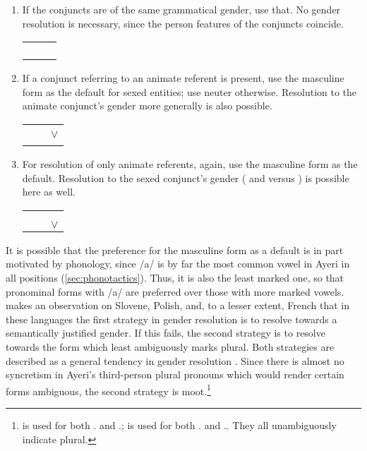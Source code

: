 \begin{enumerate}
\item If the conjuncts are of the same grammatical gender, use that. No
gender resolution is necessary, since the person features of the conjuncts
coincide.

	\quad%
	\begin{tabular}[t]{@{} c @{ $\cup$ } c @{ $\implies$ } c}
	\M{} & \M{} & \M{} \\
	\F{} & \F{} & \F{} \\
	\N{} & \N{} & \N{} \\
	\Inan{} & \Inan{} & \Inan{} \\
	\end{tabular}

\item If a conjunct referring to an animate referent is present, use the
masculine form as the default for sexed entities; use neuter otherwise.
Resolution to the animate conjunct's gender more generally is also possible.

	\quad%
	\begin{tabular}[t]{@{} c @{ $\cup$ } c @{ $\implies$ } c}
	\M{} & \Inan{} & \M{} \\
	\F{} & \Inan{} & \M{} $\lor$ \F{} \\
	\N{} & \Inan{} & \N{} \\
	\end{tabular}

\item For resolution of only animate referents, again, use the masculine form
as the default. Resolution to the sexed conjunct's gender (\M{} and \F{} versus
\N{}) is possible here as well.

	\quad%
	\begin{tabular}[t]{@{} c @{ $\cup$ } c @{ $\implies$ } c}
	\M{} & \F{} & \M{} \\
	\M{} & \N{} & \M{} \\
	\F{} & \N{} & \M{} $\lor$ \F{} \\
	\end{tabular}

\end{enumerate}

It is possible that the preference for the masculine form as a default is in
part motivated by phonology, since /a/ is by far the most common vowel in Ayeri
in all positions (\autoref{sec:phonotactics}). Thus, it is also the least
marked one, so that pronominal forms with /a/ are preferred over those with
more marked vowels. \citet{corbett1983} makes an observation on Slovene,
Polish, and, to a lesser extent, French that in these languages the first
strategy in gender resolution is to resolve towards a semantically justified
gender. If this fails, the second strategy is to resolve towards the form which
least ambiguously marks plural. Both strategies are described as a general
tendency in gender resolution \citep[205]{corbett1983}. Since there is almost
no syncretism in Ayeri's third-person plural pronouns which would render
certain forms ambiguous, the second strategy is
moot.\footnote{ is used for both \TplF{}.\Aarg{} and
\TplI{}.\Aarg{};  is used for both
\TplF{}.\Gen{} and \TplI{}.\Gen{}. They all unambiguously indicate plural.}


